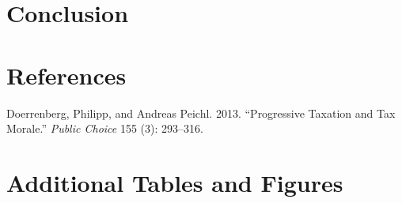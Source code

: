 \documentclass[
  12pt,
]{article}
\newlength{\cslhangindent}
\newlength{\cslentryspacingunit} %
\newenvironment{CSLReferences}[2] %
 {%
  \setlength{\parindent}{0pt}
  \ifodd #1
  \let\oldpar\par
  \def\par{\hangindent=\cslhangindent\oldpar}
  \fi
  \setlength{\parskip}{#2\cslentryspacingunit}
 }%
 {}
\newcommand{\beginsupplement}{\setcounter{table}{0}  \renewcommand{\thetable}{A\arabic{table}}     \setcounter{figure}{0} \renewcommand{\thefigure}{A\arabic{figure}}}
\begin{document}
\hypertarget{conclusion}{%
\section{Conclusion}\label{conclusion}}

\hypertarget{references}{%
\section*{References}\label{references}}

\hypertarget{refs}{}
\begin{CSLReferences}{1}{0}
\leavevmode{}%
Doerrenberg, Philipp, and Andreas Peichl. 2013. {``Progressive Taxation and Tax Morale.''} \emph{Public Choice} 155 (3): 293--316.

\end{CSLReferences}

\clearpage

\hypertarget{appendix-appendix}{%
\appendix}


\beginsupplement

\hypertarget{additional-tables-and-figures}{%
\section{Additional Tables and Figures}\label{additional-tables-and-figures}}
\end{document}
